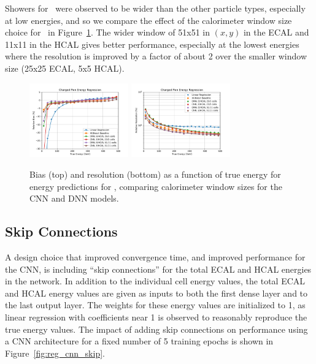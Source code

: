 Showers for \chpi\ were observed to be wider than the other particle types, especially at low energies, and so we compare the effect of the calorimeter window size choice for \chpi\ in Figure~\ref{fig:reg_nn_numcells_chpi_large_window}.  The wider window of 51x51 in $(x,y)$ in the ECAL and 11x11 in the HCAL gives better performance, especially at the lowest energies where the resolution is improved by a factor of about 2 over the smaller window size (25x25 ECAL, 5x5 HCAL).

\begin{figure}[htbp]
\centering
\includegraphics[width=0.38\textwidth]{Images/Calo/bias_vs_E_ChPiFixed_Cut30_nn_numcells.pdf}
\includegraphics[width=0.38\textwidth]{Images/Calo/res_vs_E_ChPiFixed_Cut30_nn_numcells_fits.pdf}
\caption{Bias (top) and resolution (bottom) as a function of true energy for energy predictions for \chpi, comparing calorimeter window sizes for the CNN and DNN models.
}
\label{fig:reg_nn_numcells_chpi_large_window}
\end{figure}

\subsection*{Skip Connections}

A design choice that improved convergence time, and improved performance for the CNN, is including ``skip connections'' for the total ECAL and HCAL energies in the network.  In addition to the individual cell energy values, the total ECAL and HCAL energy values are given as inputs to both the first dense layer and to the last output layer.  The weights for these energy values are initialized to 1, as linear regression with coefficients near 1 is observed to reasonably reproduce the true energy values.  The impact of adding skip connections on performance using a CNN architecture for a fixed number of 5 training epochs is shown in Figure~\ref{fig:reg_cnn_skip}.

